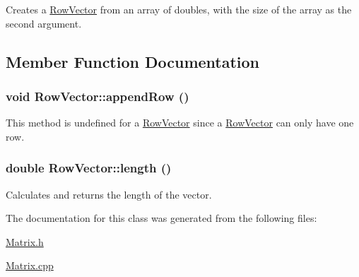 Creates a \hyperlink{class_row_vector}{RowVector} from an array of doubles, with the size of the array as the second argument. 



\subsection{Member Function Documentation}
\hypertarget{class_row_vector_a04552c6bdfed758bc06815d8696b44c}{
\subsubsection[{appendRow}]{\setlength{\rightskip}{0pt plus 5cm}void RowVector::appendRow ()}}
\label{class_row_vector_a04552c6bdfed758bc06815d8696b44c}


This method is undefined for a \hyperlink{class_row_vector}{RowVector} since a \hyperlink{class_row_vector}{RowVector} can only have one row. 

\hypertarget{class_row_vector_5c2dde299464fd200026db5515480275}{
\subsubsection[{length}]{\setlength{\rightskip}{0pt plus 5cm}double RowVector::length ()}}
\label{class_row_vector_5c2dde299464fd200026db5515480275}


Calculates and returns the length of the vector. 



The documentation for this class was generated from the following files:\begin{CompactItemize}
\item 
\hyperlink{_matrix_8h}{Matrix.h}\item 
\hyperlink{_matrix_8cpp}{Matrix.cpp}\end{CompactItemize}
